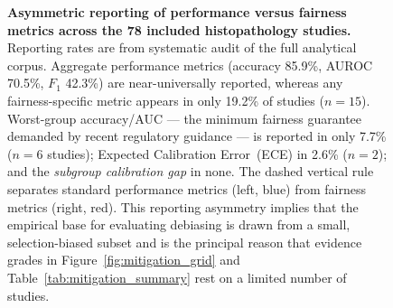 \begin{figure}[!ht]
  \caption{\textbf{Asymmetric reporting of performance versus fairness
           metrics across the 78 included histopathology
           studies.}  Reporting rates are from systematic audit of
           the full analytical corpus.  Aggregate performance metrics
           (accuracy 85.9\%, AUROC 70.5\%, $F_1$ 42.3\%) are
           near-universally reported, whereas any fairness-specific
           metric appears in only 19.2\% of studies ($n=15$).
           Worst-group accuracy/AUC --- the minimum fairness guarantee
           demanded by recent regulatory guidance --- is reported in
           only 7.7\% ($n=6$ studies); Expected Calibration
           Error~(ECE) in 2.6\% ($n=2$); and the
           \emph{subgroup calibration gap} in none.  The dashed
           vertical rule separates standard performance metrics (left,
           blue) from fairness metrics (right, red).  This reporting
           asymmetry implies that the empirical base for evaluating
           debiasing is drawn from a small, selection-biased subset
           and is the principal reason that evidence grades in
           Figure~\ref{fig:mitigation_grid} and
           Table~\ref{tab:mitigation_summary} rest on a limited
           number of studies.}
  \label{fig:metric_reporting}
\end{figure}
